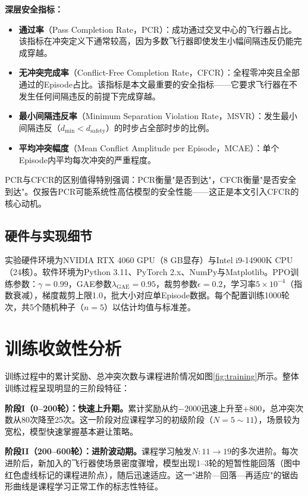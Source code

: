 \documentclass[12pt,a4paper,UTF8]{ctexbook}
\begin{document}
\textbf{深层安全指标：}
\begin{itemize}
    \item \textbf{通过率}（Pass Completion Rate，PCR）：成功通过交叉中心的飞行器占比。该指标在冲突定义下通常较高，因为多数飞行器即使发生小幅间隔违反仍能完成穿越。
    \item \textbf{无冲突完成率}（Conflict-Free Completion Rate，CFCR）：全程零冲突且全部通过的Episode占比。该指标是本文最重要的安全指标——它要求飞行器在不发生任何间隔违反的前提下完成穿越。
    \item \textbf{最小间隔违反率}（Minimum Separation Violation Rate，MSVR）：发生最小间隔违反（$d_{\min}<d_{\text{safety}}$）的时步占全部时步的比例。
    \item \textbf{平均冲突幅度}（Mean Conflict Amplitude per Episode，MCAE）：单个Episode内平均每次冲突的严重程度。
\end{itemize}

PCR与CFCR的区别值得特别强调：PCR衡量"是否到达"，CFCR衡量"是否安全到达"。仅报告PCR可能系统性高估模型的安全性能——这正是本文引入CFCR的核心动机。

\subsection{硬件与实现细节}

实验硬件环境为NVIDIA RTX 4060 GPU（8 GB显存）与Intel i9-14900K CPU（24核）。软件环境为Python 3.11、PyTorch 2.x、NumPy与Matplotlib。PPO训练参数：$\gamma=0.99$，GAE参数$\lambda_{\text{GAE}}=0.95$，裁剪参数$\epsilon=0.2$，学习率$5\times10^{-4}$（指数衰减），梯度裁剪上限1.0，批大小对应单Episode数据。每个配置训练1000轮次，共5个随机种子（$n=5$）以估计均值与标准差。

\section{训练收敛性分析}

训练过程中的累计奖励、总冲突次数与课程进阶情况如图\ref{fig:training}所示。整体训练过程呈现明显的三阶段特征：

\textbf{阶段I（0--200轮）：快速上升期。}累计奖励从约$-2000$迅速上升至$+800$，总冲突次数从80次降至25次。这一阶段对应课程学习的初级阶段（$N=5\sim11$），场景较为宽松，模型快速掌握基本避让策略。

\textbf{阶段II（200--600轮）：进阶波动期。}课程学习触发$N:11\to19$的多次进阶。每次进阶后，新加入的飞行器使场景密度骤增，模型出现1--3轮的短暂性能回落（图中红色虚线标记的课程进阶点），随后迅速适应。这一"进阶—回落—再适应"的锯齿形曲线是课程学习正常工作的标志性特征。
\end{document}
